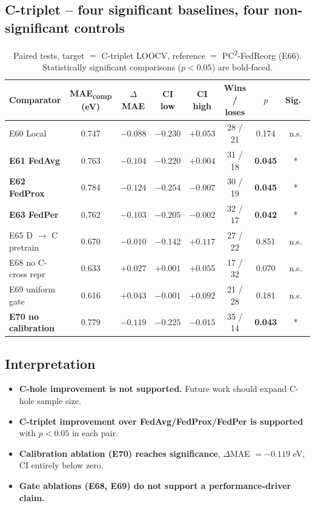 \documentclass[11pt,a4paper]{article}
\newcommand{\PC}{PC\textsuperscript{2}-FedReorg}
\begin{document}
\subsection{C-triplet -- four significant baselines, four non-significant controls}
\begin{table}[h]
\centering
\small
\caption{Paired tests, target $=$ C-triplet LOOCV, reference $=$ \PC{} (E66). Statistically significant comparisons ($p < 0.05$) are bold-faced.}\label{tab:si:paired-triplet}
\begin{tabular}{@{}lccccccc@{}}
\toprule
Comparator & MAE\textsubscript{comp} (eV) & $\Delta$MAE & CI low & CI high & Wins / loses & $p$ & Sig.\ \\
\midrule
E60 Local           & 0.747 & $-0.088$ & $-0.230$ & $+0.053$ & 28 / 21 & 0.174 & n.s. \\
\textbf{E61 FedAvg} & 0.763 & $\mathbf{-0.104}$ & $-0.220$ & $+0.004$ & 31 / 18 & \textbf{0.045} & * \\
\textbf{E62 FedProx} & 0.784 & $\mathbf{-0.124}$ & $-0.254$ & $-0.007$ & 30 / 19 & \textbf{0.045} & * \\
\textbf{E63 FedPer} & 0.762 & $\mathbf{-0.103}$ & $-0.205$ & $-0.002$ & 32 / 17 & \textbf{0.042} & * \\
E65 D $\to$ C pretrain      & 0.670 & $-0.010$ & $-0.142$ & $+0.117$ & 27 / 22 & 0.851 & n.s. \\
E68 no C-cross repr & 0.633 & $+0.027$ & $+0.001$ & $+0.055$ & 17 / 32 & 0.070 & n.s. \\
E69 uniform gate    & 0.616 & $+0.043$ & $-0.001$ & $+0.092$ & 21 / 28 & 0.181 & n.s. \\
\textbf{E70 no calibration} & 0.779 & $\mathbf{-0.119}$ & $-0.225$ & $-0.015$ & 35 / 14 & \textbf{0.043} & * \\
\bottomrule
\end{tabular}
\end{table}

\subsection{Interpretation}
\begin{itemize}
  \item \textbf{C-hole improvement is not supported.} Future work should expand C-hole sample size.
  \item \textbf{C-triplet improvement over FedAvg/FedProx/FedPer is supported} with $p < 0.05$ in each pair.
  \item \textbf{Calibration ablation (E70) reaches significance}, $\Delta$MAE $= -0.119$ eV, CI entirely below zero.
  \item \textbf{Gate ablations (E68, E69) do not support a performance-driver claim.}
\end{itemize}
\end{document}

